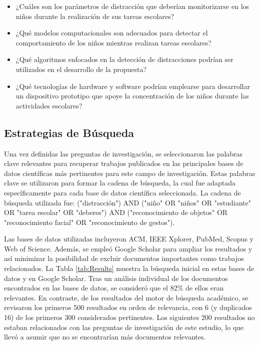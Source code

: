 \documentclass[a4paper,fleqn]{cas-sc}
\begin{document}
			\begin{itemize}
				\item ¿Cuáles son los parámetros de distracción que deberían monitorizarse en los niños durante la realización de sus tareas escolares?
				\item ¿Qué modelos computacionales son adecuados para detectar el comportamiento de los niños mientras realizan tareas escolares?
				\item ¿Qué algoritmos enfocados en la detección de distracciones podrían ser utilizados en el desarrollo de la propuesta?
				\item ¿Qué tecnologías de hardware y software podrían emplearse para desarrollar un dispositivo prototipo que apoye la concentración de los niños durante las actividades escolares?
			\end{itemize}
		
		\subsection{Estrategias de Búsqueda}
			Una vez definidas las preguntas de investigación, se seleccionaron las palabras clave relevantes para recuperar trabajos publicados en las principales bases de datos científicas más pertinentes para este campo de investigación. Estas palabras clave se utilizaron para formar la cadena de búsqueda, la cual fue adaptada específicamente para cada base de datos científica seleccionada. La cadena de búsqueda utilizada fue: ("distracción") AND ("niño" OR "niños" OR "estudiante" OR "tarea escolar" OR "deberes") AND ("reconocimiento de objetos" OR "reconocimiento facial" OR "reconocimiento de gestos").
		
			Las bases de datos utilizadas incluyeron ACM, IEEE Xplorer, PubMed, Scopus y Web of Science. Además, se empleó Google Scholar para ampliar los resultados y así minimizar la posibilidad de excluir documentos importantes como trabajos relacionados. La Tabla \ref{tab:Results} muestra la búsqueda inicial en estas bases de datos y en Google Scholar. Tras un análisis individual de los documentos encontrados en las bases de datos, se consideró que el 82\% de ellos eran relevantes. En contraste, de los resultados del motor de búsqueda académico, se revisaron los primeros 500 resultados en orden de relevancia, con 6 (y duplicados 16) de los primeros 300 considerados pertinentes. Los siguientes 200 resultados no estaban relacionados con las preguntas de investigación de este estudio, lo que llevó a asumir que no se encontrarían más documentos relevantes.
		
\end{document}
